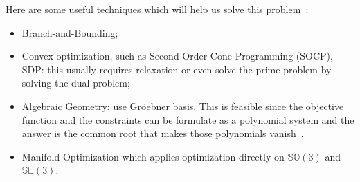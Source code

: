 \documentclass[a4paper]{article}
\begin{document}
Here are some useful techniques which will help us solve this problem~\cite{hartley2007optimal}:
\begin{itemize}
\item Branch-and-Bounding;
\item Convex optimization, such as Second-Order-Cone-Programming (SOCP), SDP: this usually requires relaxation or even solve the prime problem by solving the dual problem;
\item Algebraic Geometry: use Gr\"{o}ebner basis. This is feasible since the objective function and the constraints can be formulate as a polynomial system and the answer is the common root that makes those polynomials vanish~\cite{kukelova2008automatic}. 
\item Manifold Optimization which applies optimization directly on $\mathbb{SO}(3)$ and $\mathbb{SE}(3)$.
\end{itemize}
\end{document}
